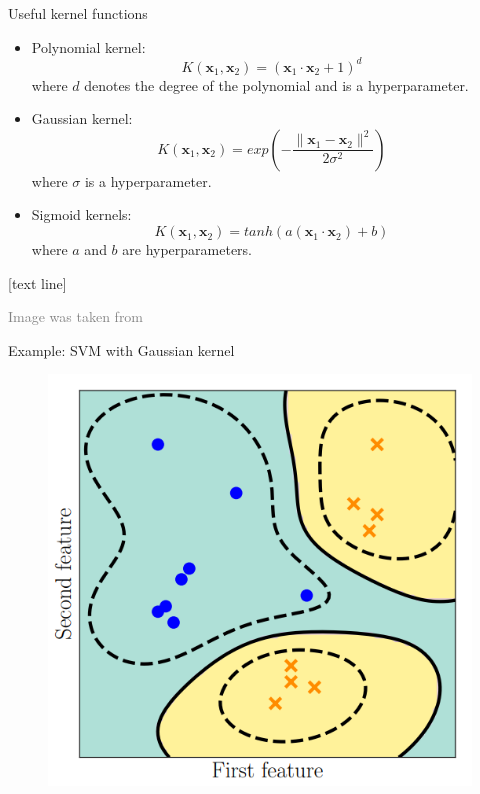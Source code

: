 \documentclass[dvipsnames]{beamer}
\newcommand{\referencefootnote}[1]{\setbeamertemplate{footline}[text line]{%
\parbox{0.9\paperwidth}{\vspace*{-23pt}\tiny{\textcolor{gray}{#1}}\hfill\scriptsize\insertframenumber}}}
\begin{document}
			\begin{frame}{Useful kernel functions}
				\begin{itemize}
					\item Polynomial kernel: 
					\[
					K(\mathbf{x}_1,\mathbf{x}_2) = (\mathbf{x}_1 \cdot \mathbf{x}_2 + 1)^d
					\]
					where $d$ denotes the degree of the polynomial and is a hyperparameter.
					\item Gaussian kernel:
					\[
					K(\mathbf{x}_1,\mathbf{x}_2) = exp\left(-\frac{\|\mathbf{x}_1 - \mathbf{x}_2 \|^2}{2\sigma^2} \right)
					\]
					where $\sigma$ is a hyperparameter.
					\item Sigmoid kernels:
					\[
					K(\mathbf{x}_1,\mathbf{x}_2) = tanh(a(\mathbf{x}_1 \cdot\mathbf{x}_2)+b)
					\]
					where $a$ and $b$ are hyperparameters.
					\end{itemize}
			\end{frame}
			
			{ \referencefootnote{Image was taken from \cite{deisenroth_faisal_ong_2020}}
			\begin{frame}{Example: SVM with Gaussian kernel}
        \begin{figure}
					\center
					\includegraphics[scale=.5]{figures/kernel1.png}
        \end{figure}
			\end{frame}
			}
			
\end{document}
